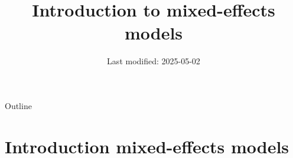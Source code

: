 \documentclass[aspectratio=169]{beamer}
\title{Introduction to mixed-effects models}
\date{Last modified: 2025-05-02}
\begin{document}
\begin{frame}{}
\thispagestyle{empty}
\titlepage
\end{frame}

\begin{frame}{Outline}
\tableofcontents
\end{frame}

\section[Introduction]{Introduction mixed-effects models}

% 
\end{document}
